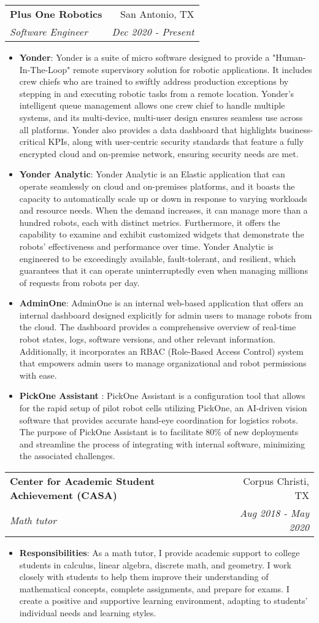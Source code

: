 \documentclass[letterpaper,11pt]{article}
\makeatletter
\newcommand{\resumeItem}[2]{
  \item\small{
    \textbf{#1}{: #2 \vspace{-2pt}}
  }
}
\newcommand{\resumeSubheading}[4]{
  \vspace{-1pt}\item
    \begin{tabular*}{0.97\textwidth}{l@{\extracolsep{\fill}}r}
      \textbf{#1} & #2 \\
      \textit{\small#3} & \textit{\small #4} \\
    \end{tabular*}\vspace{-5pt}
}
\newcommand{\resumeItemListStart}{\begin{itemize}}
\newcommand{\resumeItemListEnd}{\end{itemize}\vspace{-5pt}}
\makeatother
\begin{document}
    \resumeSubheading
      {Plus One Robotics}{San Antonio, TX}
      {Software Engineer}{Dec 2020 - Present}
      \resumeItemListStart
        \resumeItem{Yonder}
          {Yonder is a suite of micro software designed to provide a "Human-In-The-Loop" remote supervisory solution for robotic applications. It includes crew chiefs who are trained to swiftly address production exceptions by stepping in and executing robotic tasks from a remote location. Yonder's intelligent queue management allows one crew chief to handle multiple systems, and its multi-device, multi-user design ensures seamless use across all platforms. Yonder also provides a data dashboard that highlights business-critical KPIs, along with user-centric security standards that feature a fully encrypted cloud and on-premise network, ensuring security needs are met.}
        \resumeItem{Yonder Analytic}
          {Yonder Analytic is an Elastic application that can operate seamlessly on cloud and on-premises platforms, and it boasts the capacity to automatically scale up or down in response to varying workloads and resource needs. When the demand increases, it can manage more than a hundred robots, each with distinct metrics. Furthermore, it offers the capability to examine and exhibit customized widgets that demonstrate the robots' effectiveness and performance over time. Yonder Analytic is engineered to be exceedingly available, fault-tolerant, and resilient, which guarantees that it can operate uninterruptedly even when managing millions of requests from robots per day.}
        \resumeItem{AdminOne}
          {AdminOne is an internal web-based application that offers an internal dashboard designed explicitly for admin users to manage robots from the cloud. The dashboard provides a comprehensive overview of real-time robot states, logs, software versions, and other relevant information. Additionally, it incorporates an RBAC (Role-Based Access Control) system that empowers admin users to manage organizational and robot permissions with ease.}          
        \resumeItem{PickOne Assistant }
          {PickOne Assistant is a configuration tool that allows for the rapid setup of pilot robot cells utilizing PickOne, an AI-driven vision software that provides accurate hand-eye coordination for logistics robots. The purpose of PickOne Assistant is to facilitate 80\% of new deployments and streamline the process of integrating with internal software, minimizing the associated challenges.}
      \resumeItemListEnd

    \resumeSubheading
      {Center for Academic Student Achievement  (CASA)}{Corpus Christi, TX}
      {Math tutor }{Aug 2018 - May 2020}
      \resumeItemListStart
        \resumeItem{Responsibilities}
          {As a math tutor, I provide academic support to college students in calculus, linear algebra, discrete math, and geometry. I work closely with students to help them improve their understanding of mathematical concepts, complete assignments, and prepare for exams. I create a positive and supportive learning environment, adapting to students' individual needs and learning styles.}
      \resumeItemListEnd
\end{document}
